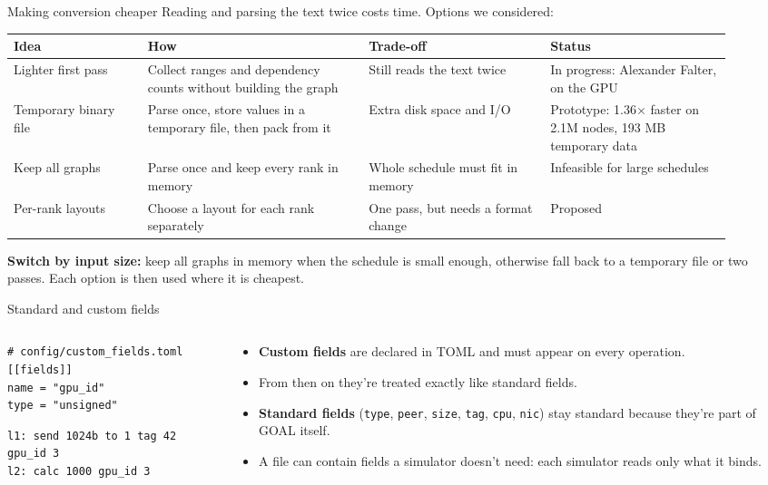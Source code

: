 \documentclass[aspectratio=169,11pt]{beamer}
\newcommand{\highlight}[1]{\colorbox{cream}{\parbox{\dimexpr\linewidth-2\fboxsep}{\small #1}}}
\begin{document}
\begin{frame}{Making conversion cheaper}
Reading and parsing the text twice costs time. Options we considered:
\vspace{3mm}

\footnotesize
\begin{tabular}{L{0.17\linewidth}L{0.29\linewidth}L{0.23\linewidth}L{0.23\linewidth}}
\toprule
\textbf{Idea} & \textbf{How} & \textbf{Trade-off} & \textbf{Status} \\
\midrule
Lighter first pass & Collect ranges and dependency counts without building the graph & Still reads the text twice & In progress: Alexander Falter, on the GPU \\
Temporary binary file & Parse once, store values in a temporary file, then pack from it & Extra disk space and I/O & Prototype: 1.36$\times$ faster on 2.1M nodes, 193 MB temporary data \\
Keep all graphs & Parse once and keep every rank in memory & Whole schedule must fit in memory & Infeasible for large schedules \\
Per-rank layouts & Choose a layout for each rank separately & One pass, but needs a format change & Proposed \\
\bottomrule
\end{tabular}
\vspace{4mm}

\highlight{\textbf{Switch by input size:} keep all graphs in memory when the schedule is small enough, otherwise fall back to a temporary file or two passes. Each option is then used where it is cheapest.}
\end{frame}

\begin{frame}[fragile]{Standard and custom fields}
\begin{columns}[T]
\begin{column}{0.44\textwidth}
\begin{lstlisting}
# config/custom_fields.toml
[[fields]]
name = "gpu_id"
type = "unsigned"
\end{lstlisting}
\begin{lstlisting}
l1: send 1024b to 1 tag 42 gpu_id 3
l2: calc 1000 gpu_id 3
\end{lstlisting}
\end{column}
\begin{column}{0.54\textwidth}
\begin{itemize}
\item \textbf{Custom fields} are declared in TOML and must appear on every operation.
\item From then on they're treated exactly like standard fields.
\item \textbf{Standard fields} (\texttt{type}, \texttt{peer}, \texttt{size}, \texttt{tag}, \texttt{cpu}, \texttt{nic}) stay standard because they're part of GOAL itself.
\item A file can contain fields a simulator doesn't need: each simulator reads only what it binds.
\end{itemize}
\end{column}
\end{columns}
\end{frame}
\end{document}
